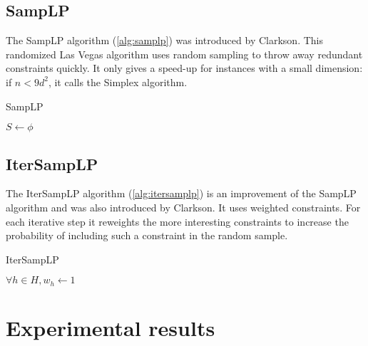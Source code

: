 \documentclass{acm_proc_article-sp}
\begin{document}
\subsection{SampLP}
The SampLP algorithm (\ref{alg:samplp}) was introduced by Clarkson\cite{clarkson1988vegas}. This randomized Las Vegas algorithm uses random sampling to throw away redundant constraints quickly. It only gives a speed-up for instances with a small dimension: if $n<9d^2$, it calls the Simplex algorithm. 


\begin{algorithm}[h]
\label{alg:samplp}
\caption{SampLP}
$S \gets \phi$\;
\end{algorithm}

\subsection{IterSampLP}
The IterSampLP algorithm (\ref{alg:itersamplp}) is an improvement of the SampLP algorithm and was also introduced by Clarkson\cite{clarkson1995vegas}. It uses weighted constraints. For each iterative step it reweights the more interesting constraints to increase the probability of including such a constraint in the random sample.


\begin{algorithm}[h]
\label{alg:itersamplp}
\caption{IterSampLP}
$\forall h \in H, w_h \gets 1$ \;
\end{algorithm}

\section{Experimental results}
\end{document}
